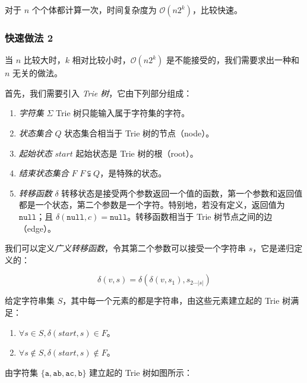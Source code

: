 \documentclass{article}
\begin{document}
对于 $n$ 个个体都计算一次，时间复杂度为 $\mathcal O(n2^k)$，比较快速。

\newpage

\subsubsection*{快速做法 2}

当 $n$ 比较大时，$k$ 相对比较小时，$\mathcal O(n2^k)$ 是不能接受的，我们需要求出一种和 $n$ 无关的做法。

首先，我们需要引入 \textsl{Trie 树}，它由下列部分组成：

\begin{enumerate}
    \item \textsl{字符集} $\Sigma$ \qquad Trie 树只能输入属于字符集的字符。
    \item \textsl{状态集合} $Q$ \qquad 状态集合相当于 Trie 树的节点（node）。
    \item \textsl{起始状态} $start$ \qquad 起始状态是 Trie 树的根（root）。
    \item \textsl{结束状态集合} $F$ \qquad $F \subsetneqq Q$，是特殊的状态。
    \item \textsl{转移函数} $\delta$ \qquad 转移状态是接受两个参数返回一个值的函数，第一个参数和返回值都是一个状态，第二个参数是一个字符。特别地，若没有定义，返回值为 $\texttt{null}$；且 $\delta(\texttt{null},c)=\texttt{null}$。转移函数相当于 Trie 树节点之间的边（edge）。
\end{enumerate}

我们可以定义\textsl{广义转移函数}，令其第二个参数可以接受一个字符串 $s$，它是递归定义的：

$$\delta(v,s)=\delta(\delta(v,s_1),s_{2 \cdots |s|})$$

给定字符串集 $S$，其中每一个元素的都是字符串，由这些元素建立起的 Trie 树满足：

\begin{enumerate}
    \item $\forall s \in S, \delta(start,s) \in F$。
    \item $\forall s \notin S, \delta(start,s) \notin F$。
\end{enumerate}

由字符集 $\{\texttt{a},\texttt{ab},\texttt{ac},\texttt{b}\}$ 建立起的 Trie 树如图所示：
\end{document}
